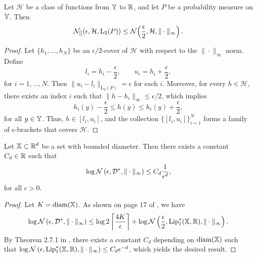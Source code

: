 \begin{lemma}\label{lemma::bracketing-number_covering_number}
Let $\mathcal{H}$ be a class of functions from $\mathbb{Y}$ to $\mathbb{R}$, and let $P$ be a probability measure on $\mathbb{Y}$. Then
\[
\mathcal{N}_{[]}\!\left(\epsilon, \mathcal{H}, \mathrm{L}_2(P)\right)
\leq
\mathcal{N}\!\left(\frac{\epsilon}{2}, \mathcal{H}, \|\cdot\|_\infty\right).
\]
\end{lemma}
\begin{proof}
Let $\{h_1, \dots, h_N\}$ be an $\epsilon/2$-cover of $\mathcal{H}$ with respect to the $\|\cdot\|_\infty$ norm. Define
\[
l_i = h_i - \frac{\epsilon}{2},
\qquad
u_i = h_i + \frac{\epsilon}{2},
\]
for $i = 1, \dots, N$. Then $\|u_i - l_i\|_{\mathrm{L}_2(P)} = \epsilon$ for each $i$.
Moreover, for every $h \in \mathcal{H}$, there exists an index $i$ such that
$\|h - h_i\|_\infty \leq \epsilon/2$, which implies
\[
h_i(y) - \frac{\epsilon}{2} \leq h(y) \leq h_i(y) + \frac{\epsilon}{2},
\]
for all $y \in \mathbb{Y}$. Thus, $h \in [l_i, u_i]$, and the collection $\{[l_i, u_i]\}_{i=1}^N$
forms a family of $\epsilon$-brackets that covers $\mathcal{H}$.
\end{proof}

\begin{lemma}\label{lemma::covnumbdstar}
    Let $\mathbb{X} \subset \mathbb{R}^d$ be a set with bounded diameter. Then there exists a constant $C_d \in \mathbb{R}$ such that
    \[
    \log \mathcal{N}\left(\epsilon, \mathcal{D}^*, \|\cdot\|_\infty\right) \leq C_d \frac{1}{\epsilon^d},
    \]
    for all $\epsilon > 0$.
\end{lemma}
\begin{proof}
Let $K = \mathrm{diam}(\mathbb{X})$. As shown on page 17 of \cite{catalano2024hierarchical}, we have
\[
\log \mathcal{N} \left(\epsilon, \mathcal{D}^*, \|\cdot\|_\infty \right) \leq \log 2 \left\lceil \frac{4K}{\epsilon}\right\rceil + \log \mathcal{N}\left(\frac{\epsilon}{2}, \mathrm{Lip}_1^*(\mathbb{X},\mathbb{R}), \|\cdot\|_\infty \right).
\]
By Theorem 2.7.1 in \cite{van1996weak}, there exists a constant $C_d$ depending on $\mathrm{diam}(\mathbb{X})$ such that $\log \mathcal{N} \left(\epsilon, \mathrm{Lip}_1^*(\mathbb{X},\mathbb{R}), \| \cdot \|_\infty \right) \leq C_d \epsilon^{-d}$, which yields the desired result.
\end{proof}



